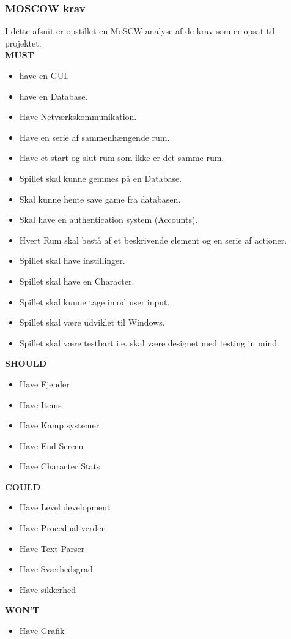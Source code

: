 \subsubsection{MOSCOW krav}
\label{sssec:MOSCOW}
I dette afsnit er opstillet en MoSCW analyse af de krav som er opsat til projektet.\\

\textbf{MUST}
\begin{itemize}

\item have en GUI.
\item have en Database.
\item Have Netværkskommunikation.
\item Have en serie af sammenhængende rum.
\item Have et start og slut rum som ikke er det samme rum.
\item Spillet skal kunne gemmes på en Database.
\item Skal kunne hente save game fra databasen.
\item Skal have en authentication system (Accounts).
\item Hvert Rum skal bestå af et beskrivende element og en serie af actioner.
\item Spillet skal have instillinger.
\item Spillet skal have en Character.
\item Spillet skal kunne tage imod user input.
\item Spillet skal være udviklet til Windows.
\item Spillet skal være testbart i.e. skal være designet med testing in mind.

\end{itemize}


\textbf{SHOULD}
\begin{itemize}

\item Have Fjender
\item Have Items
\item Have Kamp systemer
\item Have End Screen
\item Have Character Stats
 
\end{itemize}

\textbf{COULD}

\begin{itemize}

\item Have Level development
\item Have Procedual verden
\item Have Text Parser
\item Have Sværhedsgrad
\item Have sikkerhed

\end{itemize}

\textbf{WON'T}
\begin{itemize}
\item Have Grafik
\end{itemize}

 